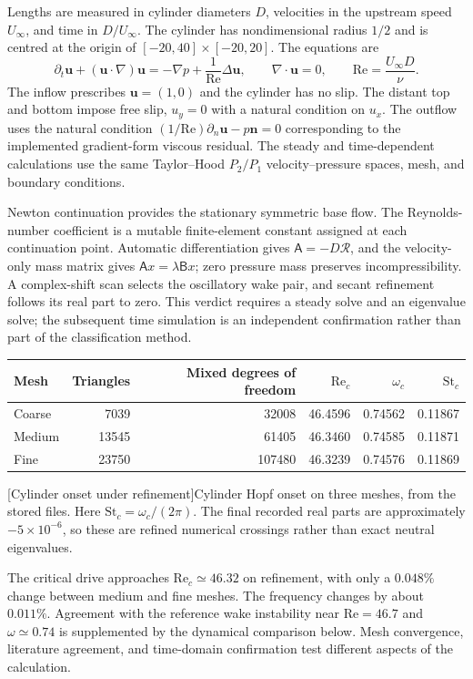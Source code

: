 Lengths are measured in cylinder diameters $D$, velocities in the upstream speed $U_\infty$, and time in $D/U_\infty$. The cylinder has nondimensional radius $1/2$ and is centred at the origin of $[-20,40]\times[-20,20]$. The equations are
\begin{equation}
\partial_t\bm u+(\bm u\cdot\nabla)\bm u=-\nabla p+\frac{1}{\mathrm{Re}}\Delta\bm u,
\qquad \nabla\cdot\bm u=0,
\qquad \mathrm{Re}=\frac{U_\infty D}{\nu}.
\label{eq:cylinder-ns}
\end{equation}
The inflow prescribes $\bm u=(1,0)$ and the cylinder has no slip. The distant top and bottom impose free slip, $u_y=0$ with a natural condition on $u_x$. The outflow uses the natural condition $(1/\mathrm{Re})\partial_n\bm u-p\bm n=0$ corresponding to the implemented gradient-form viscous residual. The steady and time-dependent calculations use the same Taylor--Hood $P_2/P_1$ velocity--pressure spaces, mesh, and boundary conditions.

Newton continuation provides the stationary symmetric base flow. The Reynolds-number coefficient is a mutable finite-element constant assigned at each continuation point. Automatic differentiation gives $\mathsf A=-D\mathcal R$, and the velocity-only mass matrix gives $\mathsf A x=\lambda\mathsf Bx$; zero pressure mass preserves incompressibility. A complex-shift scan selects the oscillatory wake pair, and secant refinement follows its real part to zero. This verdict requires a steady solve and an eigenvalue solve; the subsequent time simulation is an independent confirmation rather than part of the classification method.

\par\medskip\noindent\begin{minipage}{\linewidth}\centering\small
\begin{tabular}{lrrrrr}\toprule
Mesh & Triangles & Mixed degrees of freedom & $\mathrm{Re}_c$ & $\omega_c$ & $\mathrm{St}_c$\\\midrule
Coarse & 7039 & 32008 & 46.4596 & 0.74562 & 0.11867\\
Medium & 13545 & 61405 & 46.3460 & 0.74585 & 0.11871\\
Fine & 23750 & 107480 & 46.3239 & 0.74576 & 0.11869\\\bottomrule
\end{tabular}
[Cylinder onset under refinement]{Cylinder Hopf onset on three meshes, from the stored  files. Here $\mathrm{St}_c=\omega_c/(2\pi)$. The final recorded real parts are approximately $-5\times10^{-6}$, so these are refined numerical crossings rather than exact neutral eigenvalues.}
\label{tab:cylinder-onset}
\end{minipage}\par\medskip
The critical drive approaches $\mathrm{Re}_c\simeq46.32$ on refinement, with only a $0.048\%$ change between medium and fine meshes. The frequency changes by about $0.011\%$. Agreement with the reference wake instability near $\mathrm{Re}=46.7$ and $\omega\simeq0.74$ \cite{wake} is supplemented by the dynamical comparison below. Mesh convergence, literature agreement, and time-domain confirmation test different aspects of the calculation.


